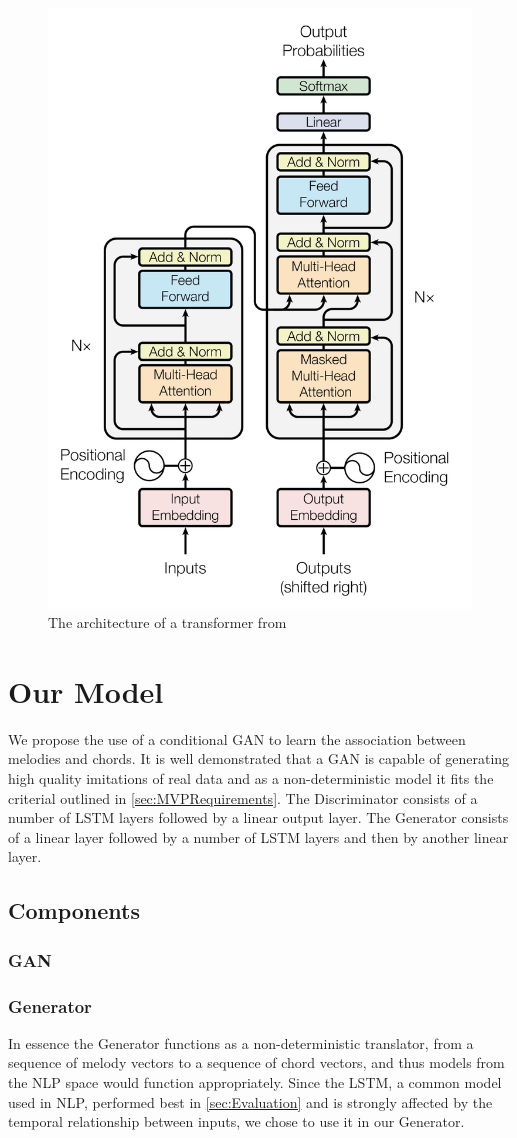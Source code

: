 \begin{figure}
    \centering
    \includegraphics[width=0.4\columnwidth]{Figures/Transformer}
    \decoRule
    \caption{The architecture of a transformer from \cite{Transformers}}
    \label{fig:Transformer}
\end{figure}

\section{Our Model}

We propose the use of a conditional GAN to learn the association between melodies and chords.
It is well demonstrated that a GAN is capable of generating high quality imitations of real data and as a non-deterministic model it fits the criterial outlined in \ref{sec:MVPRequirements}.
The Discriminator consists of a number of LSTM layers followed by a linear output layer.
The Generator consists of a linear layer followed by a number of LSTM layers and then by another linear layer.
\subsection{Components}

\subsubsection{GAN}
\subsubsection{Generator}
In essence the Generator functions as a non-deterministic translator, from a sequence of melody vectors to a sequence of chord vectors, and thus models from the NLP space would function appropriately.
Since the LSTM, a common model used in NLP, performed best in \ref{sec:Evaluation} and is strongly affected by the temporal relationship between inputs, we chose to use it in our Generator.


